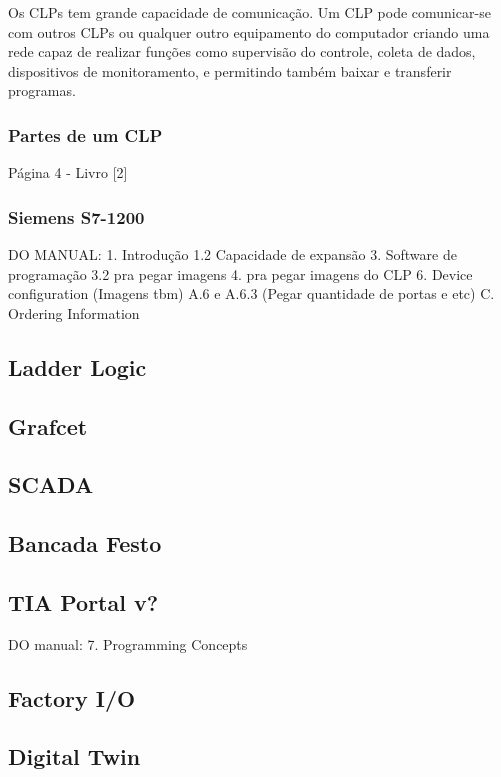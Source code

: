 \documentclass[a4paper, 12pt]{article}
\begin{document}
	Os CLPs tem grande capacidade de comunicação. Um CLP pode comunicar-se com outros CLPs ou qualquer outro
	equipamento do computador criando uma rede capaz de realizar funções como supervisão do controle, coleta de dados,
	dispositivos de monitoramento, e permitindo também baixar e transferir programas.
	
		\subsubsection{Partes de um CLP}
		Página 4 - Livro [2]
	
		\subsubsection{Siemens S7-1200}
		DO MANUAL:
		1. Introdução
		1.2 Capacidade de expansão
		3. Software de programação
		3.2 pra pegar imagens
		4. pra pegar imagens do CLP
		6. Device configuration (Imagens tbm)
		A.6 e A.6.3 (Pegar quantidade de portas e etc)
		C. Ordering Information

	\subsection{Ladder Logic}

	\subsection{Grafcet}

	\subsection{SCADA}

	\subsection{Bancada Festo}
	
	\subsection{TIA Portal v?}
	DO manual:
	7. Programming Concepts
	
	\subsection{Factory I/O}
	
	\subsection{Digital Twin}
\end{document}
